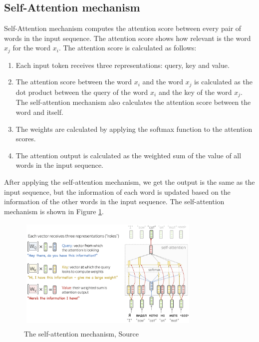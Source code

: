 \subsection{Self-Attention mechanism}
Self-Attention mechanism computes the attention score between every pair of words in the input sequence. The attention score shows how relevant is the word $x_j$ for the word $x_i$. The attention score is calculated as follows: 
\begin{enumerate}
    \item Each input token receives three representations: query, key and value.
    \item The attention score between the word $x_i$ and the word $x_j$ is calculated as the dot product between the query of the word $x_i$ and the key of the word $x_j$. The self-attention mechanism also calculates the attention score between the word and itself. 
    \item The weights are calculated by applying the softmax function to the attention scores.
    \item The attention output is calculated as the weighted sum of the value of all words in the input sequence. 
\end{enumerate}

\noindent After applying the self-attention mechanism, we get the output is the same as the input sequence, but the information of each word is updated based on the information of the other words in the input sequence. The self-attention mechanism is shown in Figure \ref{fig:self_attention_mechanism}.

\begin{figure}[ht]
    \centering
    \includegraphics[width=0.8\textwidth]{Images/5.Theoretical_Background/self_attention_mechanism.png}
    \caption{The self-attention mechanism, Source \cite{voita2020nlpCourse}}
    \label{fig:self_attention_mechanism}
\end{figure}

